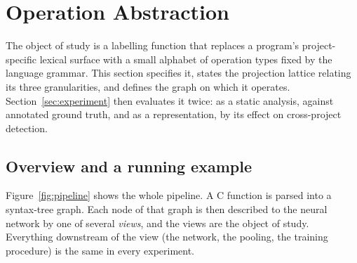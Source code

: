 \section{Operation Abstraction}
\label{sec:method}

The object of study is a labelling function that replaces a program's
project-specific lexical surface with a small alphabet of operation types
fixed by the language grammar. This section specifies it, states the
projection lattice relating its three granularities, and defines the graph on
which it operates. Section~\ref{sec:experiment} then evaluates it twice: as a
static analysis, against annotated ground truth, and as a representation, by
its effect on cross-project detection.

\subsection{Overview and a running example}
\label{sec:overview}

Figure~\ref{fig:pipeline} shows the whole pipeline. A C function is parsed into
a syntax-tree graph. Each node of that graph is then described to the neural
network by one of several \emph{views}, and the views are the object of study.
Everything downstream of the view (the network, the pooling, the training
procedure) is the same in every experiment.


